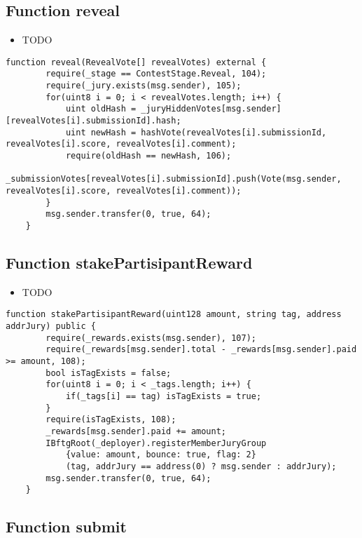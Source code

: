 \subsection{Function reveal}

\begin{itemize}
\item TODO
\end{itemize}

\begin{lstlisting}[firstnumber=155]
    function reveal(RevealVote[] revealVotes) external {
        require(_stage == ContestStage.Reveal, 104);
        require(_jury.exists(msg.sender), 105);
        for(uint8 i = 0; i < revealVotes.length; i++) {
            uint oldHash = _juryHiddenVotes[msg.sender][revealVotes[i].submissionId].hash;
            uint newHash = hashVote(revealVotes[i].submissionId, revealVotes[i].score, revealVotes[i].comment);
            require(oldHash == newHash, 106);
            _submissionVotes[revealVotes[i].submissionId].push(Vote(msg.sender, revealVotes[i].score, revealVotes[i].comment));
        }
        msg.sender.transfer(0, true, 64);
    }
\end{lstlisting}

\subsection{Function stakePartisipantReward}

\begin{itemize}
\item TODO
\end{itemize}

\begin{lstlisting}[firstnumber=204]
    function stakePartisipantReward(uint128 amount, string tag, address addrJury) public {
        require(_rewards.exists(msg.sender), 107);
        require(_rewards[msg.sender].total - _rewards[msg.sender].paid >= amount, 108);
        bool isTagExists = false;
        for(uint8 i = 0; i < _tags.length; i++) {
            if(_tags[i] == tag) isTagExists = true;
        }
        require(isTagExists, 108);
        _rewards[msg.sender].paid += amount;
        IBftgRoot(_deployer).registerMemberJuryGroup
            {value: amount, bounce: true, flag: 2}
            (tag, addrJury == address(0) ? msg.sender : addrJury);
        msg.sender.transfer(0, true, 64);
    }
\end{lstlisting}

\subsection{Function submit}

